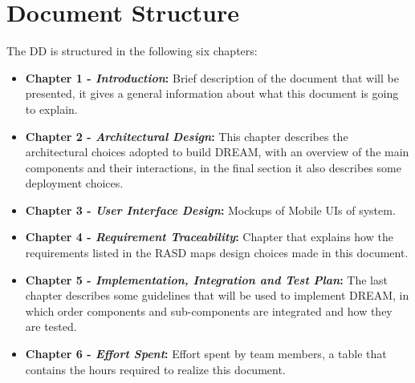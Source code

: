 \section{Document Structure}

The DD is structured in the following six chapters:
\begin{itemize}
\item \textbf{Chapter 1 -  \textit{Introduction}:} 
Brief description of the document that will be presented, it gives a general information about what this document is going to explain.
\item \textbf{Chapter 2 -  \textit{Architectural Design}:} 
This chapter describes the architectural choices adopted to build DREAM, with an overview of the main components and their interactions, in the final section it also describes some deployment choices.
\item \textbf{Chapter 3 -  \textit{User Interface Design}:} 
Mockups of Mobile UIs of system.
\item \textbf{Chapter 4 -  \textit{Requirement Traceability}:} 
Chapter that explains how the requirements listed in the RASD maps design choices made in this document.
\item \textbf{Chapter 5 -  \textit{Implementation, Integration and Test Plan}:}
The last chapter describes some guidelines that will be used to implement DREAM, in which order components and sub-components are integrated and how they are tested.
\item \textbf{Chapter 6 -  \textit{Effort Spent}:} 
Effort spent by team members, a table that contains the hours required to realize this document.
\end{itemize}